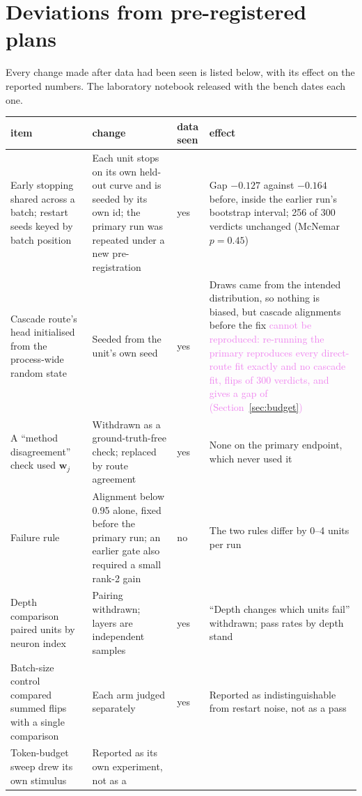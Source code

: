 \documentclass[10pt]{article}
\newcommand{\draft}[1]{\textcolor{violet}{#1}}
\begin{document}



\appendix
\section{Deviations from pre-registered plans}
\label{app:deviations}
Every change made after data had been seen is listed below, with its effect on the reported
numbers. The laboratory notebook released with the bench dates each one.

\begin{table}[h]
\centering
\scriptsize
\begin{tabular}{p{3.5cm}p{4.2cm}p{0.8cm}p{4.6cm}}
\toprule
item & change & data seen & effect \\
\midrule
Early stopping shared across a batch; restart seeds keyed by batch position &
Each unit stops on its own held-out curve and is seeded by its own id; the primary run was
repeated under a new pre-registration & yes &
Gap $-0.127$ against $-0.164$ before, inside the earlier run's bootstrap interval; 256 of 300
verdicts unchanged (McNemar $p = 0.45$) \\
Cascade route's head initialised from the process-wide random state &
Seeded from the unit's own seed & yes &
Draws came from the intended distribution, so nothing is biased, but cascade alignments
before the fix \draft{cannot be reproduced: re-running the primary reproduces every
direct-route fit exactly and no cascade fit, flips \bRFlips{} of 300 verdicts, and gives a gap of
\bRDelta{} (Section~\ref{sec:budget})} \\
A ``method disagreement'' check used $\mathbf{w}_j$ &
Withdrawn as a ground-truth-free check; replaced by route agreement & yes &
None on the primary endpoint, which never used it \\
Failure rule & Alignment below 0.95 alone, fixed before the primary run; an earlier gate
also required a small rank-2 gain & no & The two rules differ by 0--4 units per run \\
Depth comparison paired units by neuron index & Pairing withdrawn; layers are independent
samples & yes & ``Depth changes which units fail'' withdrawn; pass rates by depth stand \\
Batch-size control compared summed flips with a single comparison & Each arm judged
separately & yes & Reported as indistinguishable from restart noise, not as a pass \\
Token-budget sweep drew its own stimulus & Reported as its own experiment, not as a

\end{tabular}
\end{table}
\end{document}
